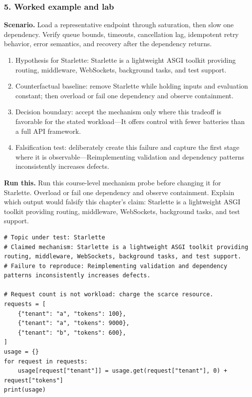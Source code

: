 \subsubsection*{5. Worked example and lab}
\textbf{Scenario.} Load a representative endpoint through saturation, then slow one dependency. Verify queue bounds, timeouts, cancellation lag, idempotent retry behavior, error semantics, and recovery after the dependency returns.
\begin{enumerate}
\item Hypothesis for Starlette: Starlette is a lightweight ASGI toolkit providing routing, middleware, WebSockets, background tasks, and test support.
\item Counterfactual baseline: remove Starlette while holding inputs and evaluation constant; then overload or fail one dependency and observe containment.
\item Decision boundary: accept the mechanism only where this tradeoff is favorable for the stated workload—It offers control with fewer batteries than a full API framework.
\item Falsification test: deliberately create this failure and capture the first stage where it is observable—Reimplementing validation and dependency patterns inconsistently increases defects.
\end{enumerate}
\textbf{Run this.} Run this course-level mechanism probe before changing it for Starlette. Overload or fail one dependency and observe containment. Explain which output would falsify this chapter's claim: Starlette is a lightweight ASGI toolkit providing routing, middleware, WebSockets, background tasks, and test support.
\begin{Verbatim}[fontsize=\scriptsize]
# Topic under test: Starlette
# Claimed mechanism: Starlette is a lightweight ASGI toolkit providing routing, middleware, WebSockets, background tasks, and test support.
# Failure to reproduce: Reimplementing validation and dependency patterns inconsistently increases defects.

# Request count is not workload: charge the scarce resource.
requests = [
    {"tenant": "a", "tokens": 100},
    {"tenant": "a", "tokens": 9000},
    {"tenant": "b", "tokens": 600},
]
usage = {}
for request in requests:
    usage[request["tenant"]] = usage.get(request["tenant"], 0) + request["tokens"]
print(usage)
\end{Verbatim}
